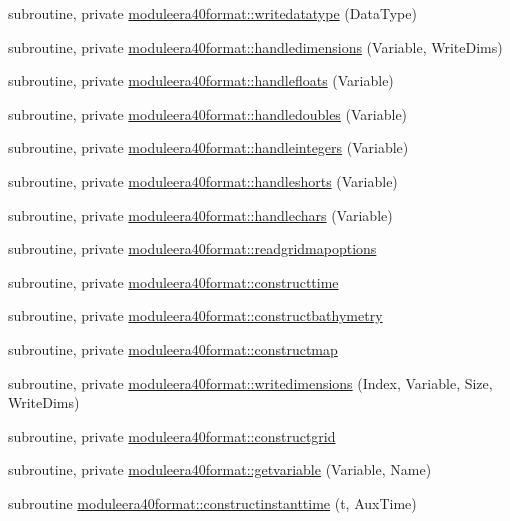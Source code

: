 \begin{DoxyCompactItemize}
\item 
subroutine, private \mbox{\hyperlink{namespacemoduleera40format_accbbdcac1635a00be7ca33013f811a29}{moduleera40format\+::writedatatype}} (Data\+Type)
\item 
subroutine, private \mbox{\hyperlink{namespacemoduleera40format_a2dffd2c3e28995426ed11ff1f4ca7ad9}{moduleera40format\+::handledimensions}} (Variable, Write\+Dims)
\item 
subroutine, private \mbox{\hyperlink{namespacemoduleera40format_a9389939d144e12060ff692086e9af89e}{moduleera40format\+::handlefloats}} (Variable)
\item 
subroutine, private \mbox{\hyperlink{namespacemoduleera40format_a54957082dfc56590cf35c0fb8138161f}{moduleera40format\+::handledoubles}} (Variable)
\item 
subroutine, private \mbox{\hyperlink{namespacemoduleera40format_a90dfe4450bbbd59c764d529d05f92d76}{moduleera40format\+::handleintegers}} (Variable)
\item 
subroutine, private \mbox{\hyperlink{namespacemoduleera40format_a0a0c22e410451c81e0c573ad2174504f}{moduleera40format\+::handleshorts}} (Variable)
\item 
subroutine, private \mbox{\hyperlink{namespacemoduleera40format_a496e3a66acda20102bdeaa457f8faf96}{moduleera40format\+::handlechars}} (Variable)
\item 
subroutine, private \mbox{\hyperlink{namespacemoduleera40format_a4218771d6a94493f1954c06107f7ec1e}{moduleera40format\+::readgridmapoptions}}
\item 
subroutine, private \mbox{\hyperlink{namespacemoduleera40format_a866d19867c0e3bcef28981a8907ea516}{moduleera40format\+::constructtime}}
\item 
subroutine, private \mbox{\hyperlink{namespacemoduleera40format_a73e47fa652795fc4885fa7d6a5c34503}{moduleera40format\+::constructbathymetry}}
\item 
subroutine, private \mbox{\hyperlink{namespacemoduleera40format_a45bd99707035a442354f99cd2597f1e5}{moduleera40format\+::constructmap}}
\item 
subroutine, private \mbox{\hyperlink{namespacemoduleera40format_aeddab9fd7b3d953ed10b899ae10ef9bb}{moduleera40format\+::writedimensions}} (Index, Variable, Size, Write\+Dims)
\item 
subroutine, private \mbox{\hyperlink{namespacemoduleera40format_ad847a1e5d762ac9c9f77372614efda16}{moduleera40format\+::constructgrid}}
\item 
subroutine, private \mbox{\hyperlink{namespacemoduleera40format_ad2e0367ac675a7a629eb4baf66bcf7c6}{moduleera40format\+::getvariable}} (Variable, Name)
\item 
subroutine \mbox{\hyperlink{namespacemoduleera40format_afe5dcd73c50804212a7b39e48bf7d428}{moduleera40format\+::constructinstanttime}} (t, Aux\+Time)
\end{DoxyCompactItemize}
